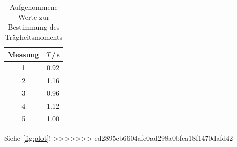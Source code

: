 \begin{table}[H]
\normalsize

\centering
{}
\begin{tabular}{c c}
\toprule
    Messung  & $T$\,/\,$\si{\second}$ \\
    \midrule

1  &   0.92   \\
2  &   1.16   \\
3  &   0.96   \\
4  &   1.12   \\
5  &   1.00   \\

    \bottomrule
\end{tabular}
\caption{Aufgenommene Werte zur Bestimmung des Trägheitsmoments}
\label{tab:a4}
\end{table}













Siehe \autoref{fig:plot}!
>>>>>>> ed2895cb6604afe0ad298a0bfca18f1470dafd42
